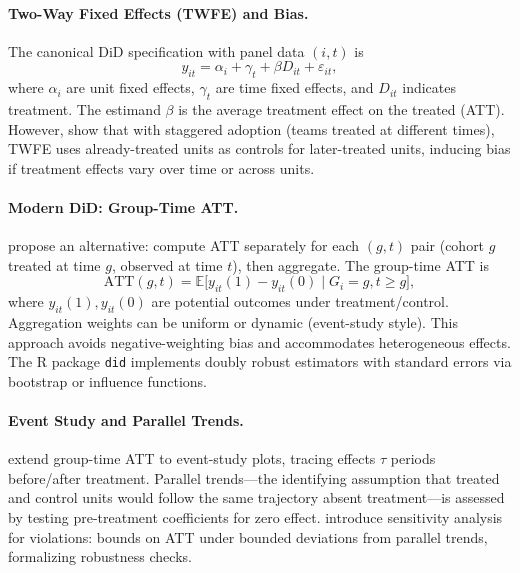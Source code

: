 \paragraph{Two-Way Fixed Effects (TWFE) and Bias.}
The canonical DiD specification with panel data $(i,t)$ is
\begin{equation}\label{eq:twfe}
y_{it} = \alpha_i + \gamma_t + \beta D_{it} + \varepsilon_{it},
\end{equation}
where $\alpha_i$ are unit fixed effects, $\gamma_t$ are time fixed effects, and $D_{it}$ indicates treatment. The estimand $\beta$ is the average treatment effect on the treated (ATT). However, \citet{goodmanbacon2021} show that with staggered adoption (teams treated at different times), TWFE uses already-treated units as controls for later-treated units, inducing bias if treatment effects vary over time or across units.

\paragraph{Modern DiD: Group-Time ATT.}
\citet{callaway2021did} propose an alternative: compute ATT separately for each $(g,t)$ pair (cohort $g$ treated at time $g$, observed at time $t$), then aggregate. The group-time ATT is
\begin{equation}\label{eq:group-time-att}
\text{ATT}(g,t) = \mathbb{E}\big[y_{it}(1) - y_{it}(0) \mid G_i=g, t\ge g\big],
\end{equation}
where $y_{it}(1), y_{it}(0)$ are potential outcomes under treatment/control. Aggregation weights can be uniform or dynamic (event-study style). This approach avoids negative-weighting bias and accommodates heterogeneous effects. The R package \texttt{did} \citep{callaway2021did} implements doubly robust estimators with standard errors via bootstrap or influence functions.

\paragraph{Event Study and Parallel Trends.}
\citet{sun2021event} extend group-time ATT to event-study plots, tracing effects $\tau$ periods before/after treatment. Parallel trends---the identifying assumption that treated and control units would follow the same trajectory absent treatment---is assessed by testing pre-treatment coefficients for zero effect. \citet{rambachan2023honest} introduce sensitivity analysis for violations: bounds on ATT under bounded deviations from parallel trends, formalizing robustness checks.


